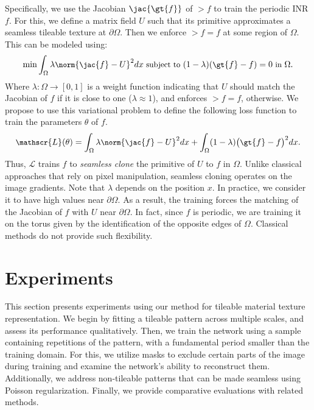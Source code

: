 Specifically, we use the Jacobian $\jac{\gt{f}}$ of $\gt{f}$ to train the periodic INR $f$.
For this, we define a matrix field $U$ such that its primitive approximates a seamless tileable texture at $\partial \Omega$.
%
Then we enforce $\gt{f}=f$ at some region of $\Omega$. This can be modeled using:
\begin{align}\label{e-gradient-interpolant}\small
\min \int_{\Omega} \lambda\norm{{\jac{f}-U}}^2dx \text{ subject to } (1-\lambda)(\gt{f}-f)=0 \text{ in } \Omega.
\end{align}
Where $\lambda:\Omega\to [0,1]$ is a weight function indicating that $U$ should match the Jacobian of $f$ if it is close to one ($\lambda\approx 1$), and enforces $\gt{f}=f$, otherwise. 
 We propose to use this variational problem to define the following loss function to train the parameters $\theta$ of $f$.
\begin{align}\label{e-blending-no-grad}\small
\mathscr{L}(\theta)={\int_{\Omega} \lambda\norm{{\jac{f}-U}}^2dx} + {\int_{\Omega} (1-\lambda)\big(\gt{f}-f\big)^2dx}.
\end{align}
\noindent
Thus, $\mathscr{L}$ trains $f$ to \textit{seamless clone} the primitive of $U$ to $f$ in $\Omega$.
Unlike classical approaches that rely on pixel manipulation, seamless cloning operates on the image gradients.
Note that $\lambda$ depends on the position $x$. In practice, we consider it to have high values near $\partial \Omega$. As a result, the training forces the matching of the Jacobian of $f$ with $U$ near $\partial \Omega$. In fact, since $f$ is periodic, we are training it on the torus given by the identification of the opposite edges of $\Omega$.
Classical methods do not provide such flexibility.

\section{Experiments}

This section presents experiments using our method for tileable material texture representation. We begin by fitting a tileable pattern across multiple scales, and assess its performance qualitatively. 
Then, we train the network using a sample containing repetitions of the pattern, with a fundamental period smaller than the training domain. For this, we utilize masks to exclude certain parts of the image during training and examine the network's ability to reconstruct them. 
Additionally, we address non-tileable patterns that can be made seamless using Poisson regularization. Finally, we provide comparative evaluations with related methods.

